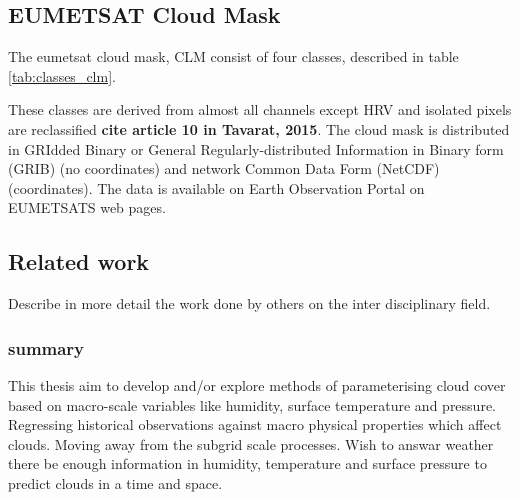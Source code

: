 \subsection{EUMETSAT Cloud Mask} \label{sec:EUMETSAT_cloud_mask}

The \acrshort{eumetsat} cloud mask, CLM consist of four classes, described in table \ref{tab:classes_clm}.




These classes are derived from almost all channels except HRV and isolated pixels are reclassified \textbf{cite article 10 in Tavarat, 2015}. The cloud mask is distributed in GRIdded Binary or General Regularly-distributed Information in Binary form (GRIB) (no coordinates) and network Common Data Form (NetCDF) (coordinates). The data is available on Earth Observation Portal on EUMETSATS web pages. 


\subsection{Related work}
Describe in more detail the work done by others on the inter disciplinary field.


\subsubsection{summary}
This thesis aim to develop and/or explore methods of parameterising cloud cover based on macro-scale variables like humidity, surface temperature and pressure. Regressing historical observations against macro physical properties which affect clouds. Moving away from the subgrid scale processes. Wish to answar weather there be enough information in humidity, temperature and surface pressure to predict clouds in a time and space.

